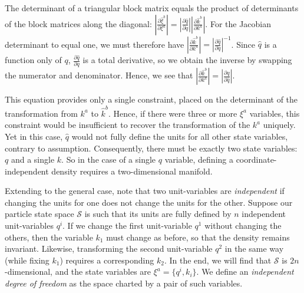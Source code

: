 \documentclass[letterpaper]{article}
\begin{document}
\noindent
The determinant of a triangular block matrix equals the product of determinants of the block matrices along the diagonal: $ \left|\frac{\partial \hat{\xi}^b}{\partial \xi^a} \right| =  \left|\frac{\partial \hat{q}}{\partial q}\right| \left|\frac{\partial \hat{k}^b}{\partial k^a}\right|$. For the Jacobian determinant to equal one, we must therefore have $\left|\frac{\partial \hat{k}^b}{\partial k^a} \right| =   \left|\frac{\partial \hat{q}}{\partial q}\right|^{-1}$. Since $\hat q$ is a function only of $q$, $\frac{\partial \hat{q}}{\partial q}$ is a total derivative, so we obtain the inverse by swapping the numerator and denominator. Hence, we see that $\left|\frac{\partial \hat{k}^b}{\partial k^a} \right| = \left|\frac{\partial q}{\partial \hat q} \right|$. 

This equation provides only a single constraint, placed on the determinant of the transformation from $k^a$ to $\hat{k}^b$. Hence, if there were three or more $\xi^a$ variables, this constraint would be insufficient to recover the transformation of the $k^a$ uniquely. Yet in this case, $\hat q$  would not fully define the units for all other state variables, contrary to assumption. Consequently, there must be exactly two state variables: $q$ and a single $k$. So in the case of a single $q$ variable, defining a coordinate-independent density requires a two-dimensional manifold.

Extending to the general case, note that two unit-variables are \textit{independent} if changing the units for one does not change the units for the other. Suppose our particle state space $\mathcal{S}$ is such that its units are fully defined by $n$ independent unit-variables $q^i$. If we change the first unit-variable $q^1$ without changing the others, then the variable $k_1$ must change as before, so that the density remains invariant. Likewise, transforming the second unit-variable $q^2$ in the same way (while fixing $k_1$) requires a corresponding $k_2$. In the end, we will find that $\mathcal{S}$ is $2n$-dimensional, and the state variables are $\xi^a = \{ q^i, k_i \}$. We define an \textit{independent degree of freedom} as the space charted by a pair of such variables.
\end{document}
